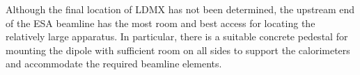 Although the final location of LDMX has not been determined, the upstream end of the ESA beamline has the most room and best access for locating the relatively large apparatus.  In particular, there is a suitable concrete pedestal for mounting the dipole with sufficient room on all sides to support the calorimeters and accommodate the required beamline elements.  


